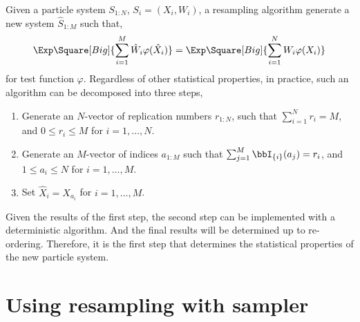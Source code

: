 Given a particle system $S_{1:N}$, $S_i = (X_i,W_i)$, a resampling algorithm
generate a new system $\hat{S}_{1:M}$ such that,
\begin{equation*}
  \Exp\Square[Big]{\sum_{i=1}^M{\hat{W}_i\varphi(\hat{X}_i)}} =
  \Exp\Square[Big]{\sum_{i=1}^N{W_i\varphi(X_i)}}
\end{equation*}
for test function $\varphi$. Regardless of other statistical properties, in
practice, such an algorithm can be decomposed into three steps,
\begin{enumerate}
  \item Generate an $N$-vector of replication numbers $r_{1:N}$, such that
    $\sum_{i=1}^N r_i = M$, and $0 \le r_i \le M$ for $i=1,\dots,N$.
  \item Generate an $M$-vector of indices $a_{1:M}$ such that $\sum_{j=1}^M
    \bbI_{\{i\}}(a_j) = r_i$, and $1 \le a_i \le N$ for $i = 1,\dots,M$.
  \item Set $\hat{X}_i = X_{a_i}$ for $i = 1,\dots,M$.
\end{enumerate}
Given the results of the first step, the second step can be implemented with a
deterministic algorithm. And the final results will be determined up to
re-ordering. Therefore, it is the first step that determines the statistical
properties of the new particle system.

\section{Using resampling with sampler}
\label{sec:Using resampling with sampler}

